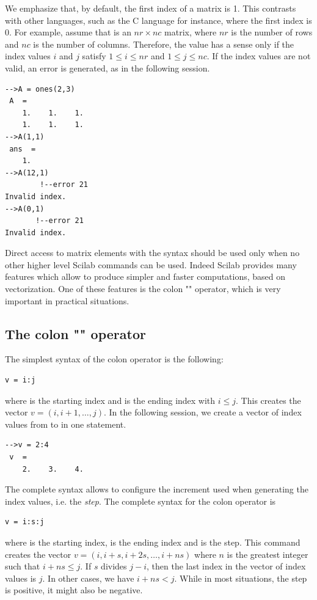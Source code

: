 We emphasize that, by default, the first index of a matrix 
is 1. This contrasts with other languages, such as the C language for instance,
where the first index is 0. For example, assume that  is an $nr\times nc$ matrix,
where $nr$ is the number of rows and $nc$ is the number of 
columns. Therefore, the value  has a sense 
only if the index values $i$ and $j$ satisfy $1\leq i\leq nr$ 
and $1\leq j\leq nc$.
If the index values are not valid, an error is generated, as in the following session.
\lstset{language=scilabscript}
\begin{lstlisting}
-->A = ones(2,3)
 A  =
    1.    1.    1.  
    1.    1.    1.  
-->A(1,1)
 ans  =
    1.  
-->A(12,1)
        !--error 21 
Invalid index.
-->A(0,1)
       !--error 21 
Invalid index.
\end{lstlisting}

Direct access to matrix elements with the  syntax 
should be used only when no other higher level Scilab commands 
can be used. Indeed Scilab provides many features which allow to produce 
simpler and faster computations, based on vectorization. 
One of these features is the colon "\scivar{:}" operator, which is very important in practical situations.

\subsection{The colon "\scivar{:}" operator}

\index{\scivar{:}}
The simplest syntax of the colon operator is the following:
\lstset{language=scilabscript}
\begin{lstlisting}
v = i:j
\end{lstlisting}
where  is the starting index and  is the ending 
index with $i\leq j$. This creates the vector $v=(i, i+1, \ldots , j)$.
In the following session, we create a vector of index values from 
 to  in one statement.
\lstset{language=scilabscript}
\begin{lstlisting}
-->v = 2:4
 v  =
    2.    3.    4.  
\end{lstlisting}

The complete syntax allows to configure the increment used when 
generating the index values, i.e. the \emph{step}. 
The complete syntax for the colon operator is
\lstset{language=scilabscript}
\begin{lstlisting}
v = i:s:j
\end{lstlisting}
where  is the starting index,  is the ending 
index and  is the step. This command creates 
the vector $v=(i, i+s, i+2s, \ldots , i+ns)$ where $n$ is the 
greatest integer such that $i+ns\leq j$. If $s$ divides $j-i$, then the last index in the 
vector of index values is $j$. In other cases, we have $i+ns<j$.
While in most situations, the step  is positive, it might 
also be negative.

